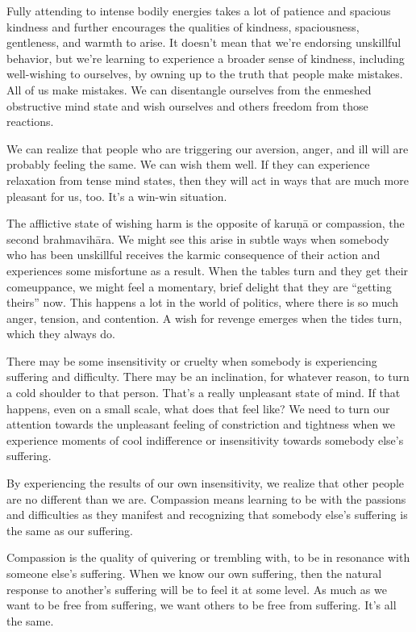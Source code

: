 Fully attending to intense bodily energies takes a lot of patience and spacious kindness and further encourages the qualities of kindness, spaciousness, gentleness, and warmth to arise. It doesn't mean that we're endorsing unskillful behavior, but we're learning to experience a broader sense of kindness, including well-wishing to ourselves, by owning up to the truth that people make mistakes. All of us make mistakes. We can disentangle ourselves from the enmeshed obstructive mind state and wish ourselves and others freedom from those reactions.

\enlargethispage{1\baselineskip}
We can realize that people who are triggering our aversion, anger, and ill will are probably feeling the same. We can wish them well. If they can experience relaxation from tense mind states, then they will act in ways that are much more pleasant for us, too. It's a win-win situation.

The afflictive state of wishing harm is the opposite of karuṇā or compassion, the second brahmavihāra. We might see this arise in subtle ways when somebody who has been unskillful receives the karmic consequence of their action and experiences some misfortune as a result. When the tables turn and they get their comeuppance, we might feel a momentary, brief delight that they are ``getting theirs'' now. This happens a lot in the world of politics, where there is so much anger, tension, and contention. A wish for revenge emerges when the tides turn, which they always do.

There may be some insensitivity or cruelty when somebody is experiencing suffering and difficulty. There may be an inclination, for whatever reason, to turn a cold shoulder to that person. That's a really unpleasant state of mind. If that happens, even on a small scale, what does that feel like? We need to turn our attention towards the unpleasant feeling of constriction and tightness when we experience moments of cool indifference or insensitivity towards somebody else's suffering.

By experiencing the results of our own insensitivity, we realize that other people are no different than we are. Compassion means learning to be with the passions and difficulties as they manifest and recognizing that somebody else's suffering is the same as our suffering.

\enlargethispage{1\baselineskip}
Compassion is the quality of quivering or trembling with, to be in resonance with someone else's suffering. When we know our own suffering, then the natural response to another's suffering will be to feel it at some level. As much as we want to be free from suffering, we want others to be free from suffering. It's all the same.

